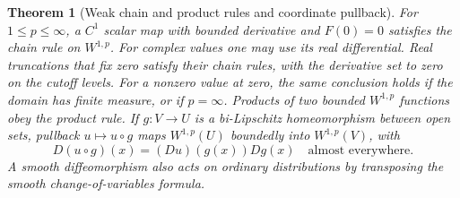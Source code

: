 \documentclass[11pt,oneside,openany]{book}
\newtheorem{theorem}{Theorem}[chapter]
\theoremstyle{definition}
\theoremstyle{remark}
\begin{document}
\begin{theorem}[Weak chain and product rules and coordinate pullback]
\label{p102:U4-06}
For \(1\leq p\leq\infty\), a \(C^1\) scalar map with bounded derivative and \(F(0)=0\) satisfies the chain rule on \(W^{1,p}\). For complex values one may use its real differential. Real truncations that fix zero satisfy their chain rules, with the derivative set to zero on the cutoff levels. For a nonzero value at zero, the same conclusion holds if the domain has finite measure, or if \(p=\infty\). Products of two bounded \(W^{1,p}\) functions obey the product rule. If \(g:V\to U\) is a bi-Lipschitz homeomorphism between open sets, pullback \(u\mapsto u\circ g\) maps \(W^{1,p}(U)\) boundedly into \(W^{1,p}(V)\), with
\[
 D(u\circ g)(x)=(Du)(g(x))Dg(x)\quad\text{almost everywhere}.
\]
A smooth diffeomorphism also acts on ordinary distributions by transposing the smooth change-of-variables formula.
\end{theorem}
\end{document}
